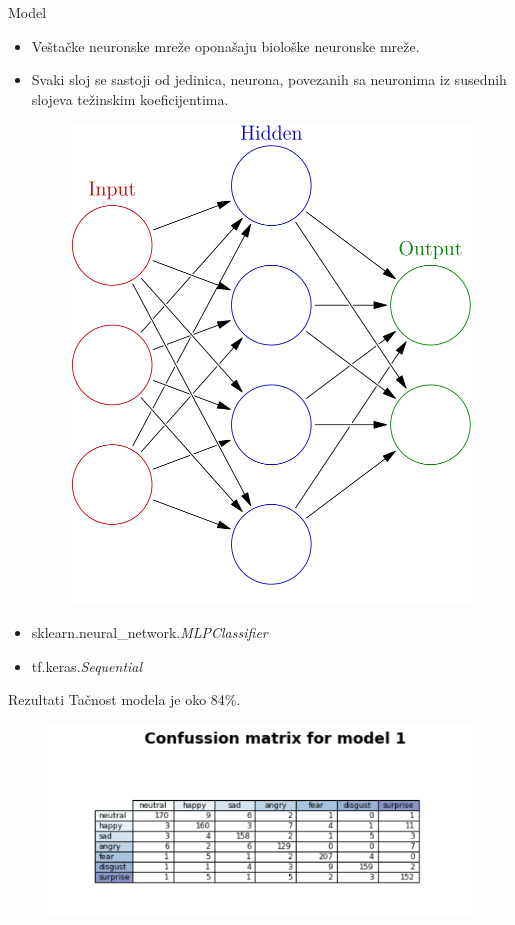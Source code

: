 \documentclass{beamer}
\begin{document}
\begin{frame}{Model}
    \begin{itemize}
        \item Veštačke neuronske mreže oponašaju biološke neuronske mreže. 
        \item Svaki sloj se sastoji od jedinica, neurona, povezanih sa neuronima iz susednih slojeva težinskim koeficijentima.
        \begin{figure}[h]
        \includegraphics[scale=0.1]{nn.png}
        \end{figure}
        \item sklearn.neural\_network.\textit{MLPClassifier}
        \item tf.keras.\textit{Sequential} 
    \end{itemize}
\end{frame}

\begin{frame}{Rezultati}
Tačnost modela je oko 84\%.
\begin{figure}[t]
\centering
\includegraphics[scale=0.5]{matrix1.png}
\end{figure}    
\end{frame}
\end{document}
